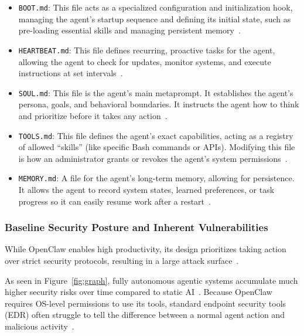 \documentclass[a4paper]{report}
\begin{document}
\begin{itemize}
    \item \texttt{BOOT.md}: This file acts as a specialized configuration and initialization hook, managing the agent's startup sequence and defining its initial state, such as pre-loading essential skills and managing persistent memory~\cite{ying2026uncovering}.

    \item \texttt{HEARTBEAT.md}: This file defines recurring, proactive tasks for the agent, allowing the agent to check for updates, monitor systems, and execute instructions at set intervals~\cite{anonymous2026systematic}.

    \item \texttt{SOUL.md}: This file is the agent's main metaprompt. It establishes the agent's persona, goals, and behavioral boundaries. It instructs the agent how to think and prioritize before it takes any action~\cite{shan2025dont}.

    \item \texttt{TOOLS.md}: This file defines the agent's exact capabilities, acting as a registry of allowed ``skills'' (like specific Bash commands or APIs). Modifying this file is how an administrator grants or revokes the agent's system permissions~\cite{shan2025dont}.

    \item \texttt{MEMORY.md}: A file for the agent's long-term memory, allowing for persistence. It allows the agent to record system states, learned preferences, or task progress so it can easily resume work after a restart~\cite{ying2026uncovering}.
\end{itemize}

\subsubsection{Baseline Security Posture and Inherent Vulnerabilities}

While OpenClaw enables high productivity, its design prioritizes taking action over strict security protocols, resulting in a large attack surface~\cite{shan2025dont, foerster2026camels}.

As seen in Figure~\ref{fig:graph}, fully autonomous agentic systems accumulate much higher security risks over time compared to static AI~\cite{sharma2025agentic}. Because OpenClaw requires OS-level permissions to use its tools, standard endpoint security tools (EDR) often struggle to tell the difference between a normal agent action and malicious activity~\cite{chen2025survey, shan2025dont}.
\end{document}
